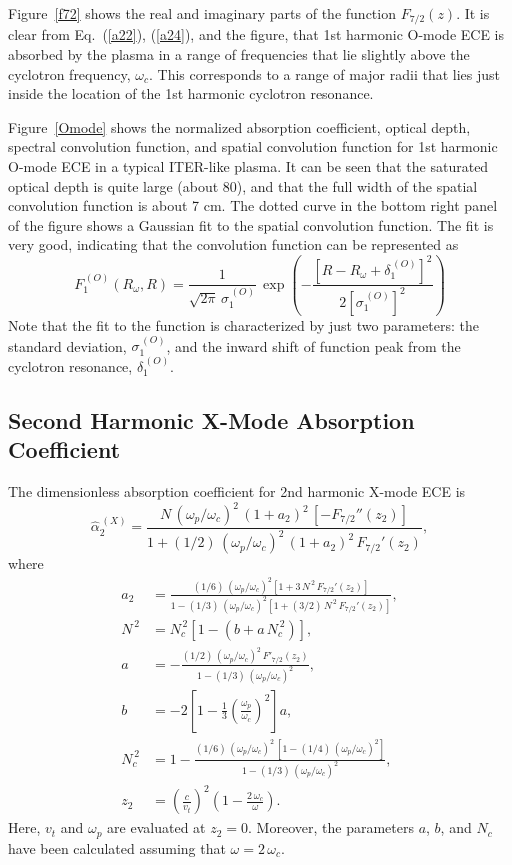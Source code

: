 \documentclass[12pt,prb,aps]{revtex4-1}
\begin{document}
 Figure~\ref{f72} shows the real and imaginary parts of the function $F_{7/2}(z)$. It is clear from Eq.~(\ref{a22}),
(\ref{a24}), and the figure, that 1st harmonic O-mode  ECE is absorbed by the plasma in a range of frequencies that lie slightly above the cyclotron frequency,
$\omega_c$. This corresponds to a range of major radii that lies just inside the location of the 1st harmonic cyclotron resonance. 

Figure~\ref{Omode} shows the normalized absorption coefficient, optical depth, spectral convolution function, and spatial convolution function for
1st harmonic O-mode ECE in a typical ITER-like plasma. It can be seen that the saturated optical depth is quite large (about 80), and that the full 
width of the spatial convolution function is about 7 cm. The dotted curve in the bottom right panel of the figure shows a Gaussian fit to the
spatial convolution function. The fit is very good, indicating that the convolution function 
can be represented as
\begin{equation}
F_1^{\,(O)}(R_\omega,R)= \frac{1}{\sqrt{2\pi}\,\sigma_1^{\,(O)}}\,
\exp\left(-\frac{\left[R-R_\omega+\delta_1^{\,(O)}\right]^2}{2\left[\sigma_1^{\,(O)}\right]^2}\right)
\end{equation}
Note that the fit to the function is characterized by just two parameters: the standard deviation, $\sigma_1^{\,(O)}$, and the inward shift
of function peak from the cyclotron resonance, $\delta_1^{\,(O)}$. 

\subsection{Second Harmonic X-Mode  Absorption Coefficient}
The dimensionless absorption coefficient for 2nd harmonic X-mode ECE is\,\cite{bornatici}
\begin{equation}
\hat{\alpha}_2^{\,(X)} = \frac{N\,(\omega_p/\omega_c)^2\,(1+a_2)^2\,[-F_{7/2}''(z_2)]}
{1+(1/2)\,(\omega_p/\omega_c)^2\,(1+a_2)^2\,F_{7/2}'(z_2)},
\end{equation}
where
\begin{align}
a_2 &= \frac{(1/6)\,(\omega_p/\omega_c)^2\left[1+3\,N^{\,2}\,F_{7/2}'(z_2)\right]}{1- (1/3)\,(\omega_p/
\omega_c)^2\left[1+(3/2)\,N^{\,2}\,F_{7/2}'(z_2)\right]},\\[0.5ex]
N^{\,2} &= N_c^{\,2}\left[1-(b+a\,N_c^{\,2})\right],\\[0.5ex]
a&= - \frac{(1/2)\,(\omega_p/\omega_c)^2\,F'_{7/2}(z_2)}{1-(1/3)\,(\omega_p/\omega_c)^2},\\[0.5ex]
b &= -2\left[1-\frac{1}{3}\left(\frac{\omega_p}{\omega_c}\right)^2\right]a,\\[0.5ex]
N_c^{\,2}&= 1 -\frac{(1/6)\,(\omega_p/\omega_c)^2\,[1-(1/4)\,(\omega_p/\omega_c)^2]}{1-(1/3)\,(\omega_p/\omega_c)^2},\\[0.5ex]
z_2 &= \left(\frac{c}{v_t}\right)^2\left(1-\frac{2\,\omega_c}{\omega}\right).
\end{align}
Here, $v_t$ and $\omega_p$ are evaluated at $z_2=0$. Moreover, the parameters $a$, $b$, and $N_c$ have been calculated assuming that $\omega=2\,\omega_c$. 
\end{document}
